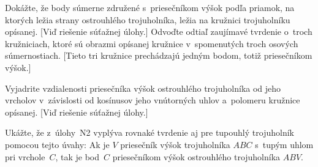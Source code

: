 {Dokážte, že body súmerne združené s~priesečníkom výšok podľa
priamok, na ktorých ležia strany ostrouhlého trojuholníka,
ležia na kružnici trojuholníku opísanej. [Viď riešenie súťažnej úlohy.]
Odvoďte odtiaľ zaujímavé tvrdenie o~troch kružniciach, ktoré sú
obrazmi opísanej kružnice v~spomenutých troch osových súmernostiach.
[Tieto tri kružnice prechádzajú jedným bodom, totiž priesečníkom výšok.]

Vyjadrite vzdialenosti priesečníka výšok ostrouhlého trojuholníka od
jeho vrcholov v~závislosti od kosínusov jeho vnútorných uhlov a~polomeru kružnice opísanej.
[Viď riešenie súťažnej úlohy.]

\D%
Ukážte, že z~úlohy~N2 vyplýva rovnaké tvrdenie aj pre tupouhlý trojuholník
pomocou tejto úvahy: Ak je $V$ priesečník výšok trojuholníka
$ABC$ s~tupým uhlom pri vrchole~$C$, tak je bod~$C$
priesečníkom výšok ostrouhlého trojuholníka $ABV$.
}

